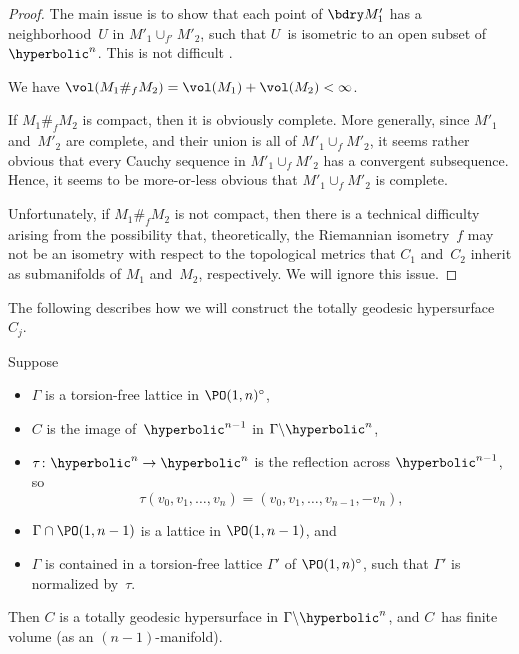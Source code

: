\begin{proof}
 The main issue is to show that each point of $\bdry M'_1$
has a neighborhood~$U$ in $M'_1 \cup_{f'} M'_2$, such that
$U$~is isometric to an open subset of~$\hyperbolic^n$. This
is not difficult .

We have $\vol(M_1 \#_f M_2) = \vol(M_1) + \vol(M_2) <
\infty$.

If $M_1 \#_f M_2$ is compact, then it is obviously
complete. More generally, since $M'_1$ and~$M'_2$ are
complete, and their union is all of $M'_1 \cup_f M'_2$, it
seems rather obvious that every Cauchy sequence in $M'_1
\cup_f M'_2$ has a convergent subsequence. Hence, it
seems to be more-or-less obvious that $M'_1 \cup_f M'_2$ is
complete.

Unfortunately, if $M_1 \#_f M_2$ is not compact, then there
is a technical difficulty arising from the possibility
that, theoretically, the Riemannian isometry~$f$ may not be
an isometry with respect to the topological metrics that
$C_1$ and~$C_2$ inherit as submanifolds of $M_1$ and~$M_2$,
respectively. 
We will ignore this issue.
 \end{proof}

The following  describes how we will construct the
totally geodesic hypersurface~$C_j$.

\begin{lem} \label{Hn-1=totgeod}
 Suppose
 \begin{itemize}
 \item $\Gamma$ is a torsion-free lattice in\/
$\PO(1,n)^\circ$,
 \item $C$ is the image of\/~$\hyperbolic^{n-1}$ in\/ $\Gamma
\backslash \hyperbolic^n$,
 \item $\tau \colon \hyperbolic^n \to \hyperbolic^n$ is the
reflection across\/ $\hyperbolic^{n-1}$, so
	$$\tau(v_0,v_1,\ldots,v_n) =
(v_0,v_1,\ldots, v_{n-1}, -v_n) ,$$
 \item $\Gamma \cap \PO(1,n-1)$ is a lattice in\/
$\PO(1,n-1)$,
and
 \item $\Gamma$ is contained in a torsion-free lattice\/
$\Gamma'$ of\/ $\PO(1,n)^\circ$, such that\/ $\Gamma'$ is
normalized by~$\tau$.
 \end{itemize}
 Then $C$ is a totally geodesic hypersurface in\/ $\Gamma
\backslash \hyperbolic^n$, and $C$~has finite volume
\textup(as an $(n-1)$-manifold\textup).
 \end{lem}

